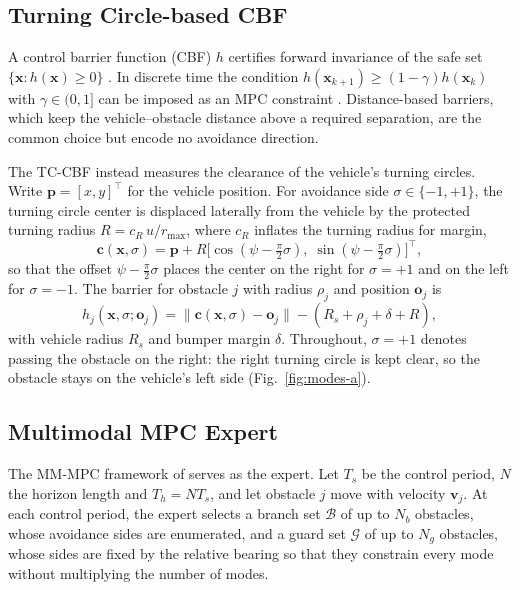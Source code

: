 \documentclass{article}
\theoremstyle{definition}
\begin{document}
\subsection{Turning Circle-based CBF}
\label{sec:tccbf}

A control barrier function (CBF) $h$ certifies forward invariance of the safe set $\{\mathbf{x}: h(\mathbf{x})\ge 0\}$ \citep{ames2016control,ames2019control}. In discrete time the condition $h(\mathbf{x}_{k+1})\ge(1-\gamma)h(\mathbf{x}_k)$ with $\gamma\in(0,1]$ can be imposed as an MPC constraint \citep{zeng2021safety}. Distance-based barriers, which keep the vehicle--obstacle distance above a required separation, are the common choice \citep{jian2023dynamic,jin2022collision} but encode no avoidance direction.

The TC-CBF \citep{arxiv-tccbf} instead measures the clearance of the vehicle's turning circles. Write $\mathbf{p}=[x,y]^\top$ for the vehicle position. For avoidance side $\sigma\in\{-1,+1\}$, the turning circle center is displaced laterally from the vehicle by the protected turning radius $R=c_R\,u/r_{\max}$, where $c_R$ inflates the turning radius for
margin,
\begin{equation}
\mathbf{c}(\mathbf{x},\sigma)=\mathbf{p}+R\big[\cos(\psi-\tfrac{\pi}{2}\sigma),\;
\sin(\psi-\tfrac{\pi}{2}\sigma)\big]^\top,
\end{equation}
so that the offset $\psi-\tfrac{\pi}{2}\sigma$ places the center on the right for $\sigma=+1$ and on the left for $\sigma=-1$. The barrier for obstacle $j$ with radius $\rho_j$ and position $\mathbf{o}_j$ is
\begin{equation}
h_j(\mathbf{x},\sigma;\mathbf{o}_j)=\big\lVert \mathbf{c}(\mathbf{x},\sigma)-\mathbf{o}_j
\big\rVert-(R_s+\rho_j+\delta+R),
\label{eq:tccbf}
\end{equation}
with vehicle radius $R_s$ and bumper margin $\delta$. Throughout, $\sigma=+1$
denotes passing the obstacle on the right: the right turning circle is kept
clear, so the obstacle stays on the vehicle's left side
(Fig.~\ref{fig:modes-a}). 

\subsection{Multimodal MPC Expert}
\label{sec:mmmpc}

The MM-MPC framework of \citet{lee2026multimodal} serves as the expert. Let $T_s$ be the control period,
$N$ the horizon length and $T_h=N T_s$, and let obstacle $j$ move with velocity $\mathbf{v}_j$. At each control period, the expert selects a branch set $\mathcal{B}$ of up to $N_b$ obstacles, whose avoidance sides are enumerated, and a guard set $\mathcal{G}$ of up to $N_g$ obstacles, whose sides are fixed by the relative bearing so that they constrain every mode without multiplying the number of modes.
\end{document}
